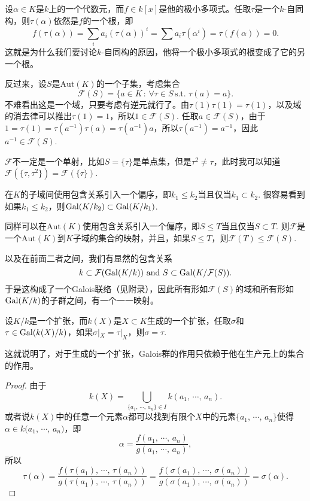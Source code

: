 设$\alpha\in K$是$k$上的一个代数元，而$f\in k[x]$是他的极小多项式。任取$\tau$是一个$k$-自同构，则$\tau(\alpha)$依然是$f$的一个根，即
\[
	f(\tau(\alpha))=\sum_i a_i (\tau(\alpha))^i=\sum a_i \tau(\alpha^i)=\tau(f(\alpha))=0.
\]
这就是为什么我们要讨论$k$-自同构的原因，他将一个极小多项式的根变成了它的另一个根。

\para 反过来，设$S$是$\mathrm{Aut}(K)$的一个子集，考虑集合
\[
	\mathcal{F}(S)=\{a\in K\,:\, \forall \tau\in S\,\text{s.t. }\tau(a)=a\}.
\]
不难看出这是一个域，只要考虑有逆元就行了。由$\tau(1)\tau(1)=\tau(1)$，以及域的消去律可以推出$\tau(1)=1$，所以$1\in \mathcal{F}(S)$. 
任取$a\in \mathcal{F}(S)$，由于$1=\tau(1)=\tau(a^{-1})\tau(a)=\tau(a^{-1})a$，所以$\tau(a^{-1})=a^{-1}$，因此$a^{-1}\in \mathcal{F}(S)$.

$\mathcal{F}$不一定是一个单射，比如$S=\{\tau\}$是单点集，但是$\tau^2\neq \tau$，此时我可以知道$\mathcal{F}(\{\tau,\tau^2\})=\mathcal{F}(\{\tau\})$.

\para 在$K$的子域间使用包含关系引入一个偏序，即$k_1\leq k_2$当且仅当$k_1\subset k_2$. 很容易看到如果$k_1\leq k_2$，则$\operatorname{Gal}(K/k_2)\subset \operatorname{Gal}(K/k_1)$. 

同样可以在$\mathrm{Aut}(K)$使用包含关系引入一个偏序，即$S\leq T$当且仅当$S\subset T$. 则$\mathcal{F}$是一个$\mathrm{Aut}(K)$到$K$子域的集合的映射，并且，如果$S\leq T$，则$\mathcal{F}(T)\leq \mathcal{F}(S)$.

以及在前面二者之间，我们有显然的包含关系
\[
	k\subset \mathcal{F}(\operatorname{Gal}(K/k))\text{ and } S\subset \operatorname{Gal}(K/\mathcal{F}(S)).
\]
于是这构成了一个Galois联络（见附录），因此所有形如$\mathcal{F}(S)$的域和所有形如$\operatorname{Gal}(K/k)$的子群之间，有一个一一映射。

\begin{lem}
设$K/k$是一个扩张，而$k(X)$是$X\subset K$生成的一个扩张，任取$\sigma$和$\tau\in \operatorname{Gal}(k(X)/k)$，如果$\sigma|_X=\tau|_X$，则$\sigma=\tau$. 
\end{lem}

这就说明了，对于生成的一个扩张，Galois群的作用只依赖于他在生产元上的集合的作用。

\begin{proof} 
	由于\[
		k(X)=\bigcup_{\{a_1\text{, $\cdots$, }a_n\}\in I} k(a_1\text{, $\cdots$, }a_n).
	\]
	或者说$k(X)$中的任意一个元素$\alpha$都可以找到有限个$X$中的元素$\{a_1$, $\cdots$, $a_n\}$使得$\alpha\in k(a_1$, $\cdots$, $a_n)$，即
	\[
		\alpha=\frac{f(a_1\text{, $\cdots$, }a_n)}{g(a_1\text{, $\cdots$, }a_n)},
	\]
	所以
	\[
		\tau(\alpha)=\frac{f(\tau(a_1)\text{, $\cdots$, }\tau(a_n))}{g(\tau(a_1)\text{, $\cdots$, }\tau(a_n))}=\frac{f(\sigma(a_1)\text{, $\cdots$, }\sigma(a_n))}{g(\sigma(a_1)\text{, $\cdots$, }\sigma(a_n))}=\sigma(\alpha).
	\]
\end{proof}

